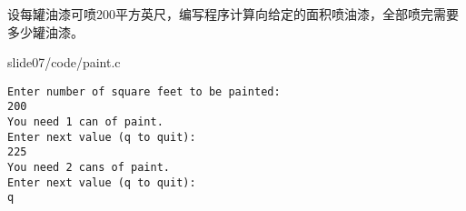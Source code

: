 \begin{frame}[fragile]\ft{\secname}
\begin{free}[例]{}
设每罐油漆可喷200平方英尺，编写程序计算向给定的面积喷油漆，全部喷完需要多少罐油漆。
\end{free}
\end{frame}

\begin{frame}[fragile]\ft{\secname}
  
  {slide07/code/paint.c}

\end{frame}

\begin{frame}[fragile]\ft{\secname}
\begin{lstlisting}[backgroundcolor=\color{blue!20}]
Enter number of square feet to be painted:
200
You need 1 can of paint.
Enter next value (q to quit):
225
You need 2 cans of paint.
Enter next value (q to quit):
q
\end{lstlisting}
\end{frame}


